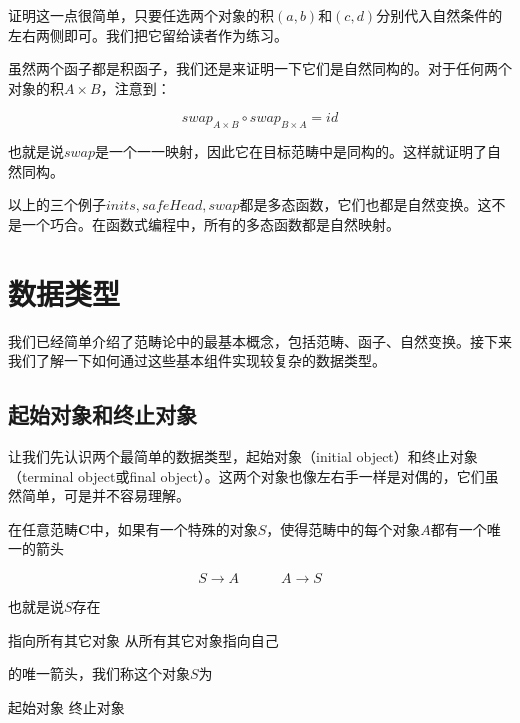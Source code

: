 \documentclass[b5paper]{ctexart}
\begin{document}
证明这一点很简单，只要任选两个对象的积$(a, b)$和$(c, d)$分别代入自然条件的左右两侧即可。我们把它留给读者作为练习。

虽然两个函子都是积函子，我们还是来证明一下它们是自然同构的。对于任何两个对象的积$A \times B$，注意到：

\[
swap_{A \times B} \circ swap_{B \times A} = id
\]

也就是说$swap$是一个一一映射，因此它在目标范畴中是同构的。这样就证明了自然同构。

以上的三个例子$inits, safeHead, swap$都是多态函数，它们也都是自然变换。这不是一个巧合。在函数式编程中，所有的多态函数都是自然映射\cite{Wadler-1989}。

\begin{Exercise}
\end{Exercise}

\section{数据类型}

我们已经简单介绍了范畴论中的最基本概念，包括范畴、函子、自然变换。接下来我们了解一下如何通过这些基本组件实现较复杂的数据类型。

\subsection{起始对象和终止对象}
让我们先认识两个最简单的数据类型，起始对象（initial object）和终止对象（terminal object或final object）。这两个对象也像左右手一样是对偶的，它们虽然简单，可是并不容易理解。

 
\begin{definition}
在任意范畴$\pmb{C}$中，如果有一个特殊的对象$S$，使得范畴中的每个对象$A$都有一个唯一的箭头

\[
  S \longrightarrow A \quad \quad \quad A \longrightarrow S
\]

也就是说$S$存在

\begin{center}
  指向所有其它对象  \quad \quad \quad 从所有其它对象指向自己
\end{center}
的唯一箭头，我们称这个对象$S$为

\begin{center}
  起始对象 \quad \quad \quad 终止对象
\end{center}
\end{definition}
\end{document}
